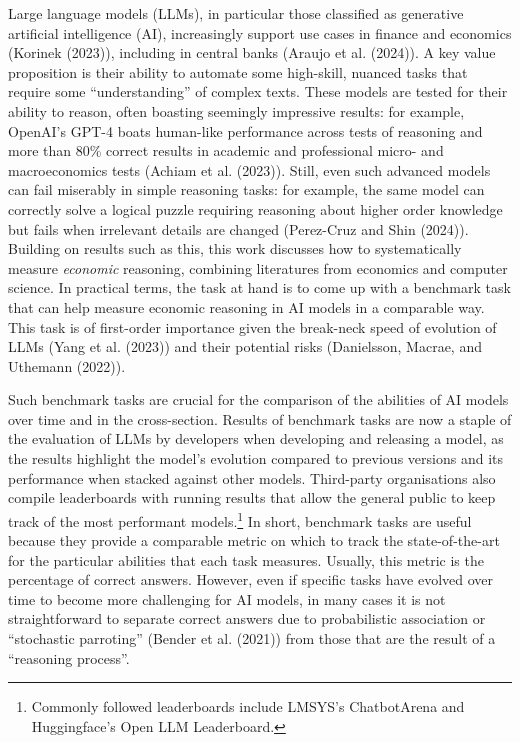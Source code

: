 \documentclass[
]{article}
\begin{document}
Large language models (LLMs), in particular those classified as
generative artificial intelligence (AI), increasingly support use cases
in finance and economics (Korinek (2023)), including in central banks
(Araujo et al. (2024)). A key value proposition is their ability to
automate some high-skill, nuanced tasks that require some
``understanding'' of complex texts. These models are tested for their
ability to reason, often boasting seemingly impressive results: for
example, OpenAI's GPT-4 boats human-like performance across tests of
reasoning and more than 80\% correct results in academic and
professional micro- and macroeconomics tests (Achiam et al. (2023)).
Still, even such advanced models can fail miserably in simple reasoning
tasks: for example, the same model can correctly solve a logical puzzle
requiring reasoning about higher order knowledge but fails when
irrelevant details are changed (Perez-Cruz and Shin (2024)). Building on
results such as this, this work discusses how to systematically measure
\emph{economic} reasoning, combining literatures from economics and
computer science. In practical terms, the task at hand is to come up
with a benchmark task that can help measure economic reasoning in AI
models in a comparable way. This task is of first-order importance given
the break-neck speed of evolution of LLMs (Yang et al. (2023)) and their
potential risks (Danielsson, Macrae, and Uthemann (2022)).

Such benchmark tasks are crucial for the comparison of the abilities of
AI models over time and in the cross-section. Results of benchmark tasks
are now a staple of the evaluation of LLMs by developers when developing
and releasing a model, as the results highlight the model's evolution
compared to previous versions and its performance when stacked against
other models. Third-party organisations also compile leaderboards with
running results that allow the general public to keep track of the most
performant models.\footnote{Commonly followed leaderboards include
  LMSYS's ChatbotArena and Huggingface's Open LLM Leaderboard.} In
short, benchmark tasks are useful because they provide a comparable
metric on which to track the state-of-the-art for the particular
abilities that each task measures. Usually, this metric is the
percentage of correct answers. However, even if specific tasks have
evolved over time to become more challenging for AI models, in many
cases it is not straightforward to separate correct answers due to
probabilistic association or ``stochastic parroting'' (Bender et al.
(2021)) from those that are the result of a ``reasoning process''.
\end{document}
